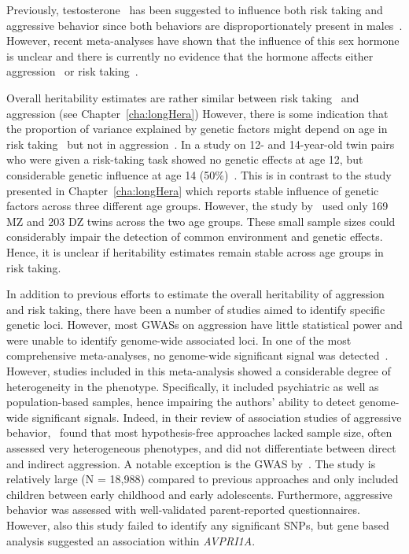 Previously, testosterone~\cite{Vermeersch2008} has been suggested to influence both risk taking and aggressive behavior since both behaviors are disproportionately present in males~\cite{Byrnes1999}.
However, recent meta-analyses have shown that  the influence of this sex hormone is unclear and there is currently no evidence that the hormone affects either aggression~\cite{Archer2005a} or risk taking~\cite{Vermeersch2008}.

Overall heritability estimates are rather similar between risk taking~\cite{Anokhin2009} and aggression (see Chapter~\ref{cha:longHera})
However, there is some indication that the proportion of variance explained by genetic factors might depend on age in risk taking~\cite{Anokhin2009} but not in aggression~\cite{Porsch2016}.
In a study on 12- and 14-year-old twin pairs who were given a risk-taking task showed no genetic effects at age 12, but considerable genetic influence at age 14 (50\%)~\cite{Anokhin2009}.
This is in contrast to the study presented in Chapter~\ref{cha:longHera} which reports stable influence of genetic factors across three different age groups.
However, the study by~\citet{Anokhin2009} used only 169 MZ and 203 DZ twins across the two age groups.
These small sample sizes could considerably impair the detection of common environment and genetic effects. 
Hence, it is unclear if heritability estimates remain stable across age groups in risk taking.

In addition to previous efforts to estimate the overall heritability of aggression and risk taking, there have been a number of studies aimed to identify specific genetic loci.
However, most GWASs on aggression have little statistical power and were unable to identify genome-wide associated loci.
In one of the most comprehensive meta-analyses, no genome-wide significant signal was detected~\citet{Vassos2014}.
However, studies included in this meta-analysis showed a considerable degree of heterogeneity in the phenotype.
Specifically, it included psychiatric as well as population-based samples, hence impairing the authors' ability to detect genome-wide significant signals.
Indeed, in their review of association studies of aggressive behavior,~\citet{Fernandez-Castillo2016} found that most hypothesis-free approaches lacked sample size, often assessed very heterogeneous phenotypes, and did not differentiate between direct and indirect aggression. 
A notable exception is the GWAS by~\citet{Pappa2016a}.
The study is relatively large (N = 18,988) compared to previous approaches and only included children between early childhood and early adolescents.
Furthermore, aggressive behavior was assessed with well-validated parent-reported questionnaires. 
However, also this study failed to identify any significant SNPs, but gene based analysis suggested an association within \textit{AVPRI1A}.

